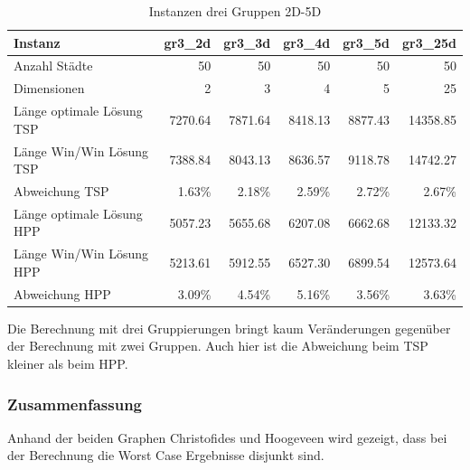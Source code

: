 \documentclass[11pt,a4paper]{article}
\begin{document}
\begin{table}[H]
        \centering
        \begin{tabular}{| l | r | r | r | r | r |}
            \hline
            Instanz                     & \textbf{gr3\_2d}     
                                        & \textbf{gr3\_3d}     
                                        & \textbf{gr3\_4d}     
                                        & \textbf{gr3\_5d}     
                                        & \textbf{gr3\_25d}             \\ \hline
                Anzahl Städte               & 50        & 50       & 50         & 50        & 50            \\ \hline
                Dimensionen                 & 2         & 3        & 4          & 5         & 25            \\ \hline
                Länge optimale Lösung TSP   & 7270.64   & 7871.64  & 8418.13    & 8877.43   & 14358.85      \\ \hline
                Länge Win/Win Lösung  TSP   & 7388.84   & 8043.13  & 8636.57    & 9118.78   & 14742.27      \\ \hline
                Abweichung TSP              & 1.63\%    &  2.18\%  &  2.59\%    &  2.72\%   & 2.67\%        \\ \hline
                Länge optimale Lösung HPP   & 5057.23   & 5655.68  & 6207.08    & 6662.68   & 12133.32      \\ \hline
                Länge Win/Win Lösung  HPP   & 5213.61   & 5912.55  & 6527.30    & 6899.54   & 12573.64      \\ \hline
                Abweichung HPP              & 3.09\%    &  4.54\%  &  5.16\%    &  3.56\%   & 3.63\%        \\ \hline
        \end{tabular}
        \caption{Instanzen drei Gruppen 2D-5D}
        \label{tab:instanzen_crowds3}
\end{table}

Die Berechnung mit drei Gruppierungen bringt kaum Veränderungen gegenüber der Berechnung mit zwei Gruppen. Auch hier ist die Abweichung beim TSP kleiner als beim HPP.

\subsubsection{Zusammenfassung}
Anhand der beiden Graphen Christofides und Hoogeveen wird gezeigt, dass bei der Berechnung die Worst Case Ergebnisse disjunkt sind.
\end{document}
